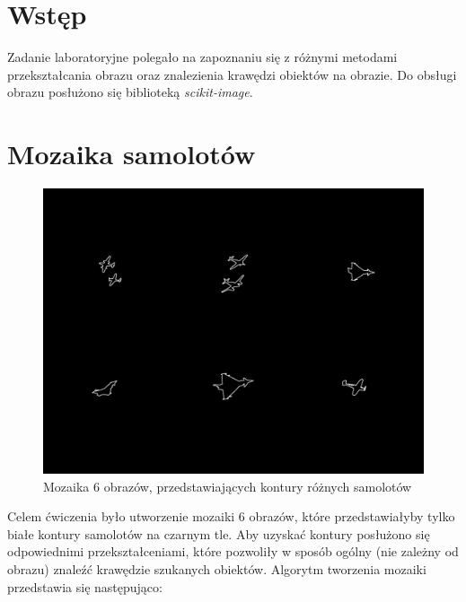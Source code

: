 \documentclass{article}
\begin{document}


\section{Wstęp}
Zadanie laboratoryjne polegało na zapoznaniu się z różnymi metodami przekształcania obrazu oraz znalezienia krawędzi obiektów na obrazie. Do obsługi obrazu posłużono się biblioteką \textit{scikit-image}.
\section{Mozaika samolotów}
\begin{figure}
\begin{center}
\includegraphics[width=1.0\textwidth]{samoloty.pdf}
\end{center}
\caption{Mozaika 6 obrazów, przedstawiających kontury różnych samolotów}
\label{fig:samoloty}
\end{figure}
Celem ćwiczenia było utworzenie mozaiki 6 obrazów, które przedstawiałyby tylko białe kontury samolotów na czarnym tle. Aby uzyskać kontury posłużono się odpowiednimi przekształceniami, które pozwoliły w sposób ogólny (nie zależny od obrazu) znaleźć krawędzie szukanych obiektów. Algorytm tworzenia mozaiki przedstawia się następująco:
\end{document}
